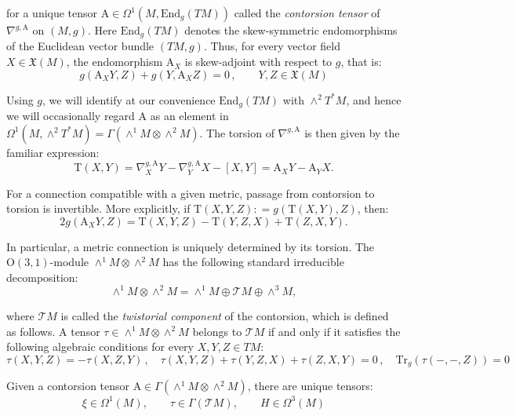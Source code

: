 \documentclass[10pt,reqno,a4paper]{amsart}
\theoremstyle{plain}
\theoremstyle{definition}
\theoremstyle{remark}
\theoremstyle{remark}
\def\mA{\mathrm{A}}
\def\mT{\mathrm{T}}
\newcommand{\End}{\mathrm{End}}
\newcommand{\Tr}{\mathrm{Tr}}
\def\cT{\mathcal{T}}
\renewcommand{\(}{ (}
\renewcommand{\)}{ )}
\begin{document}
\noindent
for a unique tensor $\mA\in\Omega^1(M,\End_g(TM))$ called the \emph{contorsion tensor} of $\nabla^{g,\mA}$ on $(M,g)$. Here $\End_g(TM)$ denotes the skew-symmetric endomorphisms of the Euclidean vector bundle $(TM,g)$. Thus, for every vector field $X\in \mathfrak{X}(M)$, the endomorphism $\mA_X$ is skew-adjoint with respect to $g$, that is:
\begin{equation*}
g(\mA_XY,Z)+g(Y,\mA_XZ)=0\, , \qquad Y , Z \in \mathfrak{X}(M)
\end{equation*}

\noindent
Using $g$, we will identify at our convenience $\End_g(TM)$ with $\wedge^2T^*M$, and hence we will occasionally regard $\mA$ as an element in $\Omega^1(M,\wedge^2T^*M) = \Gamma(\wedge^1 M \otimes \wedge^2 M)$.  The torsion of $\nabla^{g,\mA}$ is then given by the familiar expression:
\begin{equation*} 
\mT(X,Y)= \nabla^{g,\mA}_X Y - \nabla^{g,\mA}_Y X - [X,Y] = \mA_X Y-\mA_Y X.
\end{equation*}

\noindent
For a connection compatible with a given metric, passage from contorsion to torsion is invertible. More explicitly, if $\mT(X,Y,Z) : = g(\mT(X,Y),Z)$, then:
\begin{equation*} 
2g(\mA_XY,Z)=\mT(X,Y,Z)-\mT(Y,Z,X)+\mT(Z,X,Y).
\end{equation*}

\noindent
In particular, a metric connection is uniquely determined by its torsion. The $\mathrm{O}(3,1)$-module $\wedge^1 M \otimes \wedge^2 M$ has the following standard irreducible decomposition:
\begin{equation*} 
\wedge^1 M \otimes \wedge^2 M = \wedge^1 M \oplus\cT M\oplus\wedge^3 M,
\end{equation*}

\noindent
where $\cT M$ is called the \emph{twistorial component} of the contorsion, which is defined as follows. A tensor $\tau \in \wedge^1 M \otimes \wedge^2 M $ belongs to $\cT M$ if and only if it satisfies the following algebraic conditions for every $X, Y, Z \in TM$: 
\begin{equation*} 
\tau(X, Y, Z) = -\tau(X, Z, Y)\, , \quad \tau(X, Y, Z) + \tau(Y, Z, X) + \tau(Z, X, Y) = 0 \, , \quad \Tr_g(\tau(- , - , Z)) = 0
\end{equation*}
    
\noindent
Given a contorsion tensor $\mathrm{A} \in \Gamma(\wedge^1 M \otimes \wedge^2 M)$, there are unique tensors:
\begin{equation*}
\xi\in\Omega^1(M),\qquad \tau\in\Gamma(\cT M),\qquad H\in\Omega^3(M)
\end{equation*}
\end{document}
